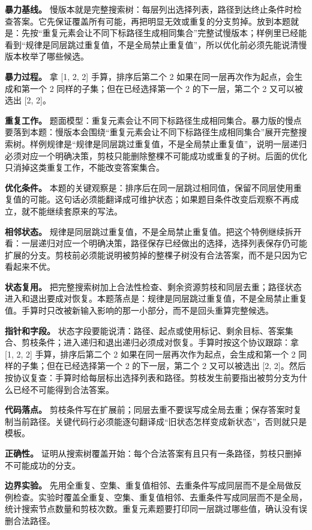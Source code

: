 \textbf{暴力基线。} 慢版本就是完整搜索树：每层列出选择列表，路径到达终止条件时检查答案。它先保证覆盖所有可能，再把明显无效或重复的分支剪掉。放到本题就是：先按“重复元素会让不同下标路径生成相同集合”完整试慢版本；样例里已经能看到“规律是同层跳过重复值，不是全局禁止重复值”，所以优化前必须先能说清慢版本枚举了哪些候选。

\textbf{暴力过程。} 拿 [1, 2, 2] 手算，排序后第二个 2 如果在同一层再次作为起点，会生成和第一个 2 同样的子集；但在已经选择第一个 2 的下一层，第二个 2 又可以被选出 [2, 2]。

\textbf{重复工作。} 题面模型：重复元素会让不同下标路径生成相同集合。暴力版的慢点要落到本题：慢版本会围绕“重复元素会让不同下标路径生成相同集合”展开完整搜索树。样例规律是“规律是同层跳过重复值，不是全局禁止重复值”，说明一层递归必须对应一个明确决策，剪枝只能删除整棵不可能成功或重复的子树。后面的优化只消掉这类重复工作，不能改变答案集合。

\textbf{优化条件。} 本题的关键观察是：排序后在同一层跳过相同值，保留不同层使用重复值的可能。这句话必须能翻译成可维护状态；如果题目条件改变后观察不再成立，就不能继续套原来的写法。

\textbf{相邻状态。} 规律是同层跳过重复值，不是全局禁止重复值。把这个特例继续拆开看：一层递归对应一个明确决策，路径保存已经做出的选择，选择列表保存仍可能扩展的分支。剪枝前必须能说明被剪掉的整棵子树没有合法答案，而不是只因为它看起来不优。

\textbf{状态复用。} 把完整搜索树加上合法性检查、剩余资源剪枝和同层去重；路径状态进入和退出要成对恢复。本题落点是：规律是同层跳过重复值，不是全局禁止重复值。手算时只改被新输入影响的那一小部分，而不是回头重算完整候选。

\textbf{指针和字段。} 状态字段要能说清：路径、起点或使用标记、剩余目标、答案集合、剪枝条件；进入递归和退出递归必须成对恢复。手算时按这个协议跟踪：拿 [1, 2, 2] 手算，排序后第二个 2 如果在同一层再次作为起点，会生成和第一个 2 同样的子集；但在已经选择第一个 2 的下一层，第二个 2 又可以被选出 [2, 2]。然后按协议复查：手算时给每层标出选择列表和路径。剪枝发生前要指出被剪分支为什么已经不可能得到合法答案。

\textbf{代码落点。} 剪枝条件写在扩展前；同层去重不要误写成全局去重；保存答案时复制当前路径。关键代码行必须能逐句翻译成“旧状态怎样变成新状态”，否则就只是模板。

\textbf{正确性。} 证明从搜索树覆盖开始：每个合法答案有且只有一条路径，剪枝只删掉不可能成功的分支。

\textbf{边界实验。} 先用全重复、空集、重复值相邻、去重条件写成同层而不是全局做反例检查。实验时覆盖全重复、空集、重复值相邻、去重条件写成同层而不是全局，统计搜索节点数量和剪枝次数。重复元素题要打印同一层跳过哪些值，确认没有误删合法路径。

